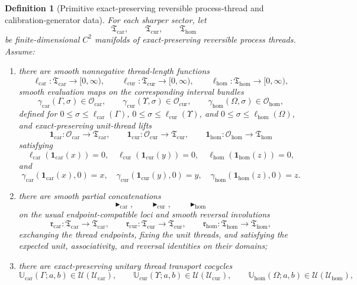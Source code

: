 \documentclass[11pt]{article}
\newcommand{\RootTensorClass}{\mathscr U_{\mathrm{car}}}
\newcommand{\RootRelabelClass}{\mathscr U_{\mathrm{cur}}}
\newcommand{\RootFreeClass}{\mathscr U_{\mathrm{hom}}}
\newcommand{\TensorObjClass}{\mathcal O_{\mathrm{car}}}
\newcommand{\CurObjClass}{\mathcal O_{\mathrm{cur}}}
\newcommand{\HomObjClass}{\mathcal O_{\mathrm{hom}}}
\newcommand{\TensorThreadClass}{\mathfrak T_{\mathrm{car}}}
\newcommand{\CurThreadClass}{\mathfrak T_{\mathrm{cur}}}
\newcommand{\HomThreadClass}{\mathfrak T_{\mathrm{hom}}}
\newcommand{\TensorThreadLength}{\ell_{\mathrm{car}}}
\newcommand{\CurThreadLength}{\ell_{\mathrm{cur}}}
\newcommand{\HomThreadLength}{\ell_{\mathrm{hom}}}
\newcommand{\TensorThreadEval}{\gamma_{\mathrm{car}}}
\newcommand{\CurThreadEval}{\gamma_{\mathrm{cur}}}
\newcommand{\HomThreadEval}{\gamma_{\mathrm{hom}}}
\newcommand{\TensorThreadUnit}{\mathbf 1_{\mathrm{car}}}
\newcommand{\CurThreadUnit}{\mathbf 1_{\mathrm{cur}}}
\newcommand{\HomThreadUnit}{\mathbf 1_{\mathrm{hom}}}
\newcommand{\TensorThreadConcat}{\blacktriangleright_{\mathrm{car}}}
\newcommand{\CurThreadConcat}{\blacktriangleright_{\mathrm{cur}}}
\newcommand{\HomThreadConcat}{\blacktriangleright_{\mathrm{hom}}}
\newcommand{\TensorThreadRev}{\mathfrak r_{\mathrm{car}}}
\newcommand{\CurThreadRev}{\mathfrak r_{\mathrm{cur}}}
\newcommand{\HomThreadRev}{\mathfrak r_{\mathrm{hom}}}
\newcommand{\TensorThreadRep}{\mathbb U_{\mathrm{car}}}
\newcommand{\CurThreadRep}{\mathbb U_{\mathrm{cur}}}
\newcommand{\HomThreadRep}{\mathbb U_{\mathrm{hom}}}
\newtheorem{definition}{Definition}
\begin{document}
\begin{definition}[Primitive exact-preserving reversible process-thread and calibration-generator data]
\label{def:threads}
For each sharper sector, let
\[
\TensorThreadClass,\qquad
\CurThreadClass,\qquad
\HomThreadClass
\]
be finite-dimensional \(C^2\) manifolds of exact-preserving reversible process threads. Assume:
\begin{enumerate}
    \item there are smooth nonnegative thread-length functions
    \[
    \TensorThreadLength:\TensorThreadClass\to[0,\infty),\qquad
    \CurThreadLength:\CurThreadClass\to[0,\infty),\qquad
    \HomThreadLength:\HomThreadClass\to[0,\infty),
    \]
    smooth evaluation maps on the corresponding interval bundles
    \[
    \TensorThreadEval(\Gamma,\sigma)\in\TensorObjClass,\qquad
    \CurThreadEval(\Upsilon,\sigma)\in\CurObjClass,\qquad
    \HomThreadEval(\Omega,\sigma)\in\HomObjClass,
    \]
    defined for \(0\le \sigma\le \TensorThreadLength(\Gamma)\), \(0\le \sigma\le \CurThreadLength(\Upsilon)\), and \(0\le \sigma\le \HomThreadLength(\Omega)\), and exact-preserving unit-thread lifts
    \[
    \TensorThreadUnit:\TensorObjClass\to\TensorThreadClass,\qquad
    \CurThreadUnit:\CurObjClass\to\CurThreadClass,\qquad
    \HomThreadUnit:\HomObjClass\to\HomThreadClass
    \]
    satisfying
    \[
    \TensorThreadLength(\TensorThreadUnit(x))=0,\quad
    \CurThreadLength(\CurThreadUnit(y))=0,\quad
    \HomThreadLength(\HomThreadUnit(z))=0,
    \]
    and
    \[
    \TensorThreadEval(\TensorThreadUnit(x),0)=x,\quad
    \CurThreadEval(\CurThreadUnit(y),0)=y,\quad
    \HomThreadEval(\HomThreadUnit(z),0)=z.
    \]
    \item there are smooth partial concatenations
    \[
    \TensorThreadConcat,\qquad
    \CurThreadConcat,\qquad
    \HomThreadConcat
    \]
    on the usual endpoint-compatible loci and smooth reversal involutions
    \[
    \TensorThreadRev:\TensorThreadClass\to\TensorThreadClass,\qquad
    \CurThreadRev:\CurThreadClass\to\CurThreadClass,\qquad
    \HomThreadRev:\HomThreadClass\to\HomThreadClass,
    \]
    exchanging the thread endpoints, fixing the unit threads, and satisfying the expected unit, associativity, and reversal identities on their domains;
    \item there are exact-preserving unitary thread transport cocycles
    \[
    \TensorThreadRep(\Gamma;a,b)\in\mathcal U(\RootTensorClass),\qquad
    \CurThreadRep(\Upsilon;a,b)\in\mathcal U(\RootRelabelClass),\qquad
    \HomThreadRep(\Omega;a,b)\in\mathcal U(\RootFreeClass),
\]
\end{enumerate}
\end{definition}
\end{document}
